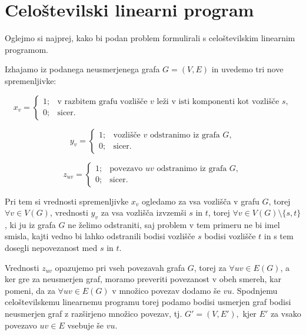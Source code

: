 \documentclass[a4paper,12pt]{article}
\theoremstyle{definition}
\begin{document}
\section{Celoštevilski linearni program}

Oglejmo si najprej, kako bi podan problem formulirali s celoštevilskim 
linearnim programom.

Izhajamo iz podanega neusmerjenega grafa $G = (V, E)$ in 
uvedemo tri nove spremenljivke:

\begin{displaymath}
	x_{v} = \left\{
		\begin{array}{ll}
			1; &\text{v razbitem grafu vozlišče } v
			\text{ leži v isti komponenti kot vozlišče }s, \\
			0; &\text{sicer}.
		\end{array}\right.
\end{displaymath}

\begin{displaymath}
	y_{v} = \left\{
		\begin{array}{ll}
			1; &\text{vozlišče } v \text{ odstranimo iz grafa }G, \\
			0; &\text{sicer}.
		\end{array}\right.
\end{displaymath}

\begin{displaymath}
	z_{uv} = \left\{
		\begin{array}{ll}
			1; &\text{povezavo } uv \text{ odstranimo iz grafa }G, \\
			0; &\text{sicer}.
		\end{array}\right.
\end{displaymath}

Pri tem si vrednosti spremenljivke $x_v$ ogledamo za vsa vozlišča v grafu $G$, torej 
$\forall{v} \in V(G)$, vrednosti $y_v$ za vsa vozlišča izvzemši $s$ in $t$,
torej $\forall{v} \in V(G)\setminus \{s, t\}$, ki ju iz grafa $G$ ne želimo odstraniti, saj problem v tem primeru
ne bi imel smisla, kajti vedno bi lahko odstranili bodisi 
vozlišče $s$ bodisi vozlišče $t$ in s tem dosegli nepovezanost med $s$ in $t$.

Vrednosti $z_{uv}$ opazujemo pri vseh povezavah grafa $G$,
torej za $\forall uv \in E(G)$, a ker gre za neusmerjen graf, moramo preveriti 
povezanost v obeh smereh, kar pomeni, da za $\forall uv \in E(G)$ v množico povezav
dodamo še $vu$. Spodnjemu celoštevilskemu linearnemu programu torej podamo
bodisi usmerjen graf bodisi neusmerjen graf z razširjeno množico povezav, 
tj. $G' = (V, E'),$ kjer $E'$ za vsako povezavo $uv \in E$ vsebuje še $vu$.\\
\end{document}
